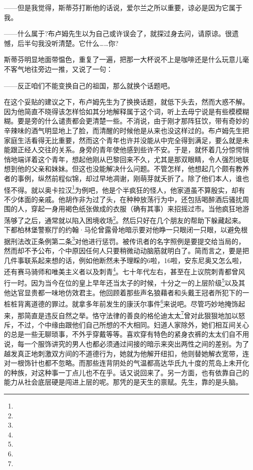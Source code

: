 \par ——但是我觉得，斯蒂芬打断他的话说，爱尔兰之所以重要，谅必是因为它属于我。
\par ——什么属于?布卢姆先生以为自己或许误会了，就探过身去问，请原谅。很遗憾，后半句我没听清楚。它什么……你?
\par 斯蒂芬明显地面带愠色，重复了一遍，把那一大杯说不上是咖啡还是什么玩意儿毫不客气地往旁边一推，又说了一句：
\par ——反正咱们不能变换自己的祖国，那么就换个话题吧。
\par 在这个妥贴的建议之下，布卢姆先生为了换换话题，就低下头去，然而大惑不解。因为他简直不晓得该怎样恰如其分地解释属于这个词，听上去毋宁说是有些模模糊糊。要是旁的什么谴责都会更清楚一些。不消说，由于刚才那阵狂饮，带有奇妙的辛辣味的酒气明显地上了脸，而清醒的时候他是从来也没这样过的。布卢姆先生把家庭生活看得无比重要，然而这个青年也许并没能从中完全得到满足，要么就是未能跟正经人交往的关系。身旁的青年使他感到些许不安。于是，就怀着几分惊愕悄悄地端详着这个青年，想起他刚从巴黎回来不久，尤其是那双眼睛，令人强烈地联想到他的父亲和妹妹。但这也没能解决什么问题。不管怎样，他想起几个颇有教养者的事例，纵然前程似锦，却过早地凋谢，刚萌芽就夭折了。除了他们本人，谁也怪不得。就以奥卡拉汉\footnote{}为例吧，他是个半疯狂的怪人，他家道虽不算殷实，却有不少体面的亲戚。他胡作非为过了头，在种种放荡行为中，还包括喝醉酒后骚扰周围的人，穿起一身用褐色纸张做成的衣服（确有其事）来招摇过市。当他疯狂地游荡够了之后，通常就以陷入困境收场\footnote{}。然后只好在几个朋友的帮助下躲藏起来。下都柏林堡警察厅的约翰·马伦曾露骨地暗示要对他睁一只眼闭一只眼，以避免根据刑法改正条例第二条\footnote{}对他进行惩罚。被传讯者的名字照例是要提交给当局的，然而却不予公布，个中原因任何人只要稍微动动脑筋就明白了。简而言之，要是把几件事联系起来想的话，例如他断然未予理睬的6啦，16啦，安东尼奥又怎么啦，还有赛马骑师和唯美主义者以及刺青\footnote{}。七十年代左右，甚至在上议院刺青都曾风行一时。因为当今在位的皇上早年还当太子的时候，十分之一的上层阶级\footnote{}以及其他达官显贵都一味地仿效君主。他回顾着那些声名狼藉者和头戴王冠者所犯下的一桩桩背离道德的罪过。就拿多年前发生的康沃尔事件\footnote{}来说吧。尽管巧妙地掩饰起来，那简直是违反自然之举。恪守法律的善良的格伦迪太太\footnote{}曾对此狠狠地加以怒斥，不过，个中缘由跟他们自己所想的不大相同。妇道人家除外，她们相互间关心的总是一些无聊琐事，不外乎穿戴等等。喜欢穿有特色的紧身衣裤的太太们自不用说，每一个服饰讲究的男人也都必须通过间接的暗示来突出两性之间的差别。为了越发真正地刺激双方间的不道德行为，她就为他解开纽扣，他则替她解衣宽带，连对一根饰针也都不忽略。而那些连背阴处的气温都高达华氏九十度的荒岛上未开化的种族，对这种事一丁点儿也不在乎。话又说回来了。另一方面，也有依靠自己的能力从社会底层硬是闯进上层的呢。那凭的是天生的禀赋。先生，靠的是头脑。

